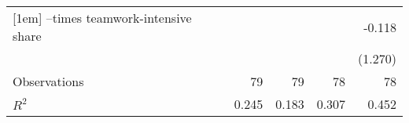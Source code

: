 {\begin{tabular}{l*{4}{D{.}{.}{-1}}}
[1em]
--times teamwork-intensive share&                     &                     &                     &      -0.118         \\
                    &                     &                     &                     &     (1.270)         \\
\hline
Observations        &          79         &          79         &          78         &          78         \\
\(R^{2}\)           &       0.245         &       0.183         &       0.307         &       0.452         \\
\hline\hline
\end{tabular}
}
